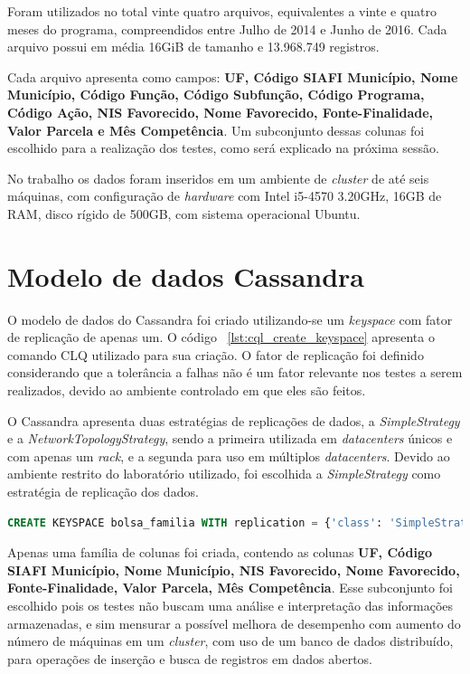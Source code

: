 Foram utilizados no total vinte quatro arquivos, equivalentes a vinte e quatro meses do programa, compreendidos entre Julho de 2014 e Junho de 2016. Cada arquivo possui em média 16GiB de tamanho e 13.968.749 registros.

Cada arquivo apresenta como campos: \textbf{UF, Código SIAFI Município, Nome Município, Código Função, Código Subfunção, Código Programa, Código Ação, NIS Favorecido, Nome Favorecido, Fonte-Finalidade, Valor Parcela e Mês Competência}. Um subconjunto dessas colunas foi escolhido para a realização dos testes, como será explicado na próxima sessão.

No trabalho os dados foram inseridos em um ambiente de \emph{cluster} de até seis máquinas, com configuração de \emph{hardware} com Intel i5-4570 3.20GHz, 16GB de RAM, disco rígido de 500GB, com sistema operacional Ubuntu.

\section{Modelo de dados Cassandra}
O modelo de dados do Cassandra foi criado utilizando-se um \emph{keyspace} com fator de replicação de apenas um. O código ~\ref{lst:cql_create_keyspace} apresenta o comando CLQ utilizado para sua criação. O fator de replicação foi definido considerando que a tolerância a falhas não é um fator relevante nos testes a serem realizados, devido ao ambiente controlado em que eles são feitos.

O Cassandra apresenta duas estratégias de replicações de dados, a \emph{SimpleStrategy} e a \emph{NetworkTopologyStrategy}, sendo a primeira utilizada em \emph{datacenters} únicos e com apenas um \emph{rack}, e a segunda para uso em múltiplos \emph{datacenters}. Devido ao ambiente restrito do laboratório utilizado, foi escolhida a \emph{SimpleStrategy} como estratégia de replicação dos dados.

\noindent
\begin{minipage}[c]{1\textwidth}
\begin{lstlisting}[caption={Código CQL criação do keyspace},label={lst:cql_create_keyspace},language=SQL]
CREATE KEYSPACE bolsa_familia WITH replication = {'class': 'SimpleStrategy', 'replication_factor': 1};
\end{lstlisting}
\end{minipage}

Apenas uma família de colunas foi criada, contendo as colunas \textbf{UF, Código SIAFI Município, Nome Município, NIS Favorecido, Nome Favorecido, Fonte-Finalidade, Valor Parcela, Mês Competência}. Esse subconjunto foi escolhido pois os testes não buscam uma análise e interpretação das informações armazenadas, e sim mensurar a possível melhora de desempenho com aumento do número de máquinas em um \emph{cluster}, com uso de um banco de dados distribuído, para operações de inserção e busca de registros em dados abertos.

